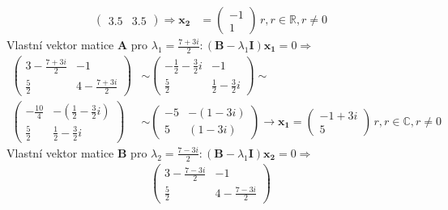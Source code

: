 \begin{example}
\begin{align*}
\begin{pmatrix}
       3.5  &  3.5
    \end{pmatrix}
    \Rightarrow\mathbf{x_2} &=
    \begin{pmatrix}
      -1 \\ 1
    \end{pmatrix}
    \, r, r\in\mathbb{R}, r\neq0
  \end{align*}
  Vlastní vektor matice \(\mathbf{A}\) pro \(\lambda_1=\frac{7+3i}{2}: (\mathbf{B} - 
  \lambda_1\mathbf{I})\mathbf{x_1}=0 \Rightarrow\)
  \begin{align}
    \begin{pmatrix}
       3 - \frac{7+3i}{2}            & -1                                     \\
       \frac{5}{2}                   &  4 - \frac{7+3i}{2}
    \end{pmatrix}
    &\sim
    \begin{pmatrix}
      -\frac{1}{2}-\frac{3}{2}i      &  -1                                     \\
      \frac{5}{2}                    & \frac{1}{2}-\frac{3}{2}i
    \end{pmatrix}
    \sim                                                                          \\
    \begin{pmatrix}
      -\frac{10}{4}                  &-\left(\frac{1}{2} -\frac{3}{2}i\right)  \\
      \frac{5}{2}                    & \frac{1}{2}-\frac{3}{2}i
    \end{pmatrix}
    &\sim
    \begin{pmatrix}
      -5                           &-\left(1-3i\right)                         \\
       5                           & \left(1-3i\right)
    \end{pmatrix}
    \rightarrow \mathbf{x_1}=
    \begin{pmatrix}
      -1+3i \\ 5
    \end{pmatrix}
    \, r, r\in\mathbb{C}, r\neq0
  \end{align}
  Vlastní vektor matice \(\mathbf{B}\) pro \(\lambda_2=\frac{7-3i}{2}: (\mathbf{B} - 
  \lambda_1\mathbf{I})\mathbf{x_2}=0 \Rightarrow\)
  \begin{align*}
    \begin{pmatrix}
       3  - \frac{7-3i}{2}       &  -1                                     \\
      \frac{5}{2}                &  4 - \frac{7-3i}{2}

\end{pmatrix}
\end{align*}
\end{example}
